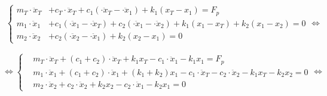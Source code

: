 \begin{align}\label{eq_2dof_system}
    \left\{
    \begin{aligned}
        m_T \cdot \ddot{x}_T &+ c_T \cdot \ddot{x}_T + c_1 (\cdot \ddot{x}_T - \cdot \ddot{x}_1) + k_1 (x_T - x_1) = F_p \\
        m_1 \cdot \ddot{x}_1 &+ c_1 (\cdot \ddot{x}_1 - \cdot \ddot{x}_T) + c_2 (\cdot \ddot{x}_1 - \cdot \ddot{x}_2) + k_1 (x_1 - x_T) + k_2 (x_1 - x_2) = 0 \\
        m_2 \cdot \ddot{x}_2 &+ c_2 (\cdot \ddot{x}_2 - \cdot \ddot{x}_1) + k_2 (x_2 - x_1) = 0
    \end{aligned}
    \right. 
    \Longleftrightarrow
    \end{align}
    
    \vspace{5mm}
    
    \begin{equation*} 
    \Longleftrightarrow
    \left\{
    \begin{aligned}
        &m_T \cdot \ddot{x}_T + (c_1 + c_2) \cdot \ddot{x}_T + k_1 x_T - c_1 \cdot \ddot{x}_1 - k_1 x_1 = F_p \\
        &m_1 \cdot \ddot{x}_1 + (c_1 + c_2) \cdot \ddot{x}_1 + (k_1 + k_2) x_1 - c_1 \cdot \ddot{x}_T - c_2 \cdot \ddot{x}_2 - k_1 x_T - k_2 x_2 = 0 \\
        &m_2 \cdot \ddot{x}_2 + c_2 \cdot \ddot{x}_2 + k_2 x_2 - c_2 \cdot \ddot{x}_1 - k_2 x_1 = 0
    \end{aligned}
    \right.
    \Longleftrightarrow
    \end{equation*}
    
    \vspace{5mm}
    
